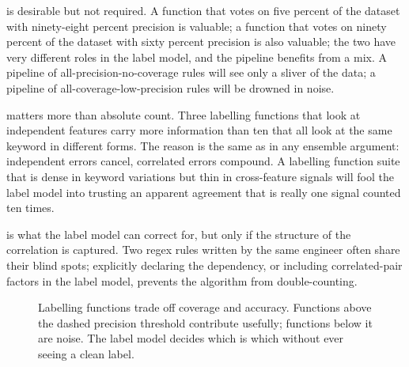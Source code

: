  is desirable but not required. A function that votes on five percent of the dataset with ninety-eight percent precision is valuable; a function that votes on ninety percent of the dataset with sixty percent precision is also valuable; the two have very different roles in the label model, and the pipeline benefits from a mix. A pipeline of all-precision-no-coverage rules will see only a sliver of the data; a pipeline of all-coverage-low-precision rules will be drowned in noise.

 matters more than absolute count. Three labelling functions that look at independent features carry more information than ten that all look at the same keyword in different forms. The reason is the same as in any ensemble argument: independent errors cancel, correlated errors compound. A labelling function suite that is dense in keyword variations but thin in cross-feature signals will fool the label model into trusting an apparent agreement that is really one signal counted ten times.

 is what the label model can correct for, but only if the structure of the correlation is captured. Two regex rules written by the same engineer often share their blind spots; explicitly declaring the dependency, or including correlated-pair factors in the label model, prevents the algorithm from double-counting.

\begin{figure}
\centering
{}
\caption{Labelling functions trade off coverage and accuracy. Functions above the dashed precision threshold contribute usefully; functions below it are noise. The label model decides which is which without ever seeing a clean label.}
\label{fig:lf_tradeoff}
\end{figure}


